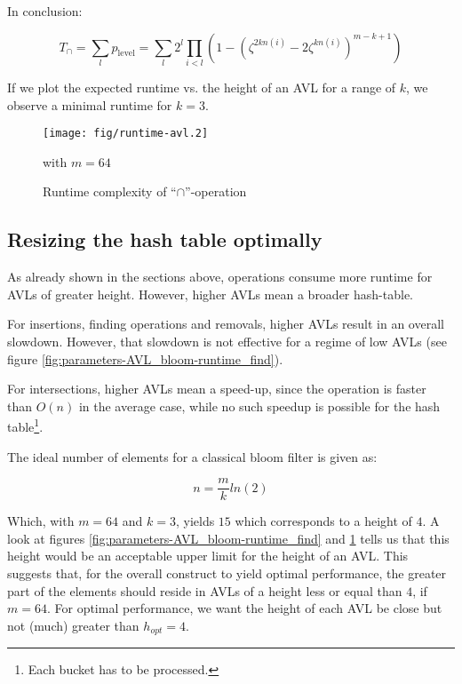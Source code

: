         In conclusion:

        \begin{equation}
            T_{\cap} = \sum_l p_\mathrm{level} =
            \sum_l 2^l \prod_{i<l} \left(1 - \left(
                \zeta^{2kn(i)} -2\zeta^{kn(i)}
            \right)^{m-k+1} \right)
        \end{equation}

        If we plot the expected runtime vs. the height of an AVL for a range of
        $k$, we observe a minimal runtime for $k=3$.

        \begin{figure}[!h]
            \caption{Runtime complexity of ``$\cap$''-operation}
            \label{fig:parameters-AVL_bloom-runtime_intersection}
            \begin{center}
                \texttt{[image: fig/runtime-avl.2]}

                with $m=64$
            \end{center}
        \end{figure}

    \subsection{Resizing the hash table optimally}
    \label{sec:parameters-ht_resize}

        As already shown in the sections above, operations consume more runtime
        for AVLs of greater height.
        However, higher AVLs mean a broader hash-table.

        For insertions, finding operations and removals, higher AVLs result in
        an overall slowdown.
        However, that slowdown is not effective for a regime of low AVLs (see
        figure \ref{fig:parameters-AVL_bloom-runtime_find}).

        For intersections, higher AVLs mean a speed-up, since the operation is
        faster than $O(n)$ in the average case, while no such speedup is
        possible for the hash table\footnote{Each bucket has to be processed.}.

        The ideal number of elements for a classical bloom filter is given as:

        \begin{equation}
            n = \frac{m}{k} ln(2)
        \end{equation}

        Which, with $m=64$ and $k=3$, yields $15$ which corresponds to a height
        of $4$.
        A look at figures \ref{fig:parameters-AVL_bloom-runtime_find} and
        \ref{fig:parameters-AVL_bloom-runtime_intersection} tells us that this
        height would be an acceptable upper limit for the height of an AVL.
        This suggests that, for the overall construct to yield optimal
        performance, the greater part of the elements should reside in AVLs of
        a height less or equal than $4$, if $m=64$. For optimal performance, we
        want the height of each AVL be close but not (much) greater than
        $h_{opt}=4$.


